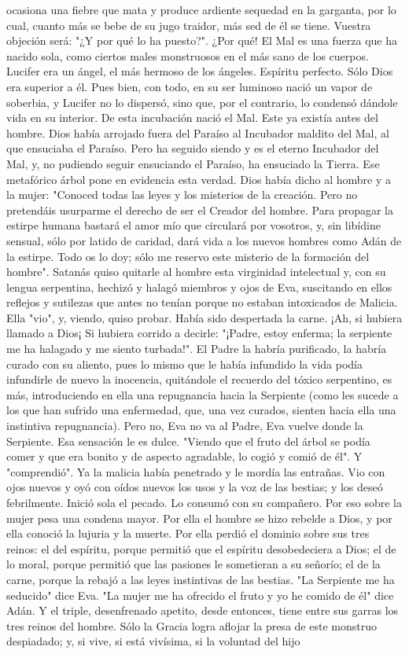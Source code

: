 \documentclass[12pt, twoside, openright]{book} %
\begin{document}
ocasiona una fiebre que mata y produce ardiente sequedad en la garganta, por lo cual, cuanto más se bebe de su jugo traidor, más sed de él se tiene. Vuestra objeción será: "¿Y por qué lo ha puesto?". ¿Por qué! El Mal es una fuerza que ha nacido sola, como ciertos males monstruosos en el más sano de los cuerpos. Lucifer era un ángel, el más hermoso de los ángeles. Espíritu perfecto. Sólo Dios era superior a él. Pues bien, con todo, en su ser luminoso nació un vapor de soberbia, y Lucifer no lo dispersó, sino que, por el contrario, lo condensó dándole vida en su interior. De esta incubación nació el Mal. Este ya existía antes del hombre. Dios había arrojado fuera del Paraíso al Incubador maldito del Mal, al que ensuciaba el Paraíso. Pero ha seguido siendo y es el eterno Incubador del Mal, y, no pudiendo seguir ensuciando el Paraíso, ha ensuciado la Tierra. Ese metafórico árbol pone en evidencia esta verdad. Dios había dicho al hombre y a la mujer: "Conoced todas las leyes y los misterios de la creación. Pero no pretendáis usurparme el derecho de ser el Creador del hombre. Para propagar la estirpe humana bastará el amor mío que circulará por vosotros, y, sin libídine sensual, sólo por latido de caridad, dará vida a los nuevos hombres como Adán de la estirpe. Todo os lo doy; sólo me reservo este misterio de la formación del hombre". Satanás quiso quitarle al hombre esta virginidad intelectual y, con su lengua serpentina, hechizó y halagó miembros y ojos de Eva, suscitando en ellos reflejos y sutilezas que antes no tenían porque no estaban intoxicados de Malicia. Ella "vio", y, viendo, quiso probar. Había sido despertada la carne. ¡Ah, si hubiera llamado a Dios¡ Si hubiera corrido a decirle: "¡Padre, estoy enferma; la serpiente me ha halagado y me siento turbada!". El Padre la habría purificado, la habría curado con su aliento, pues lo mismo que le había infundido la vida podía infundirle de nuevo la inocencia, quitándole el recuerdo del tóxico serpentino, es más, introduciendo en ella una repugnancia hacia la Serpiente (como les sucede a los que han sufrido una enfermedad, que, una vez curados, sienten hacia ella una instintiva repugnancia). Pero no, Eva no va al Padre, Eva vuelve donde la Serpiente. Esa sensación le es dulce. "Viendo que el fruto del árbol se podía comer y que era bonito y de aspecto agradable, lo cogió y comió de él". Y "comprendió". Ya la malicia había penetrado y le mordía las entrañas. Vio con ojos nuevos y oyó con oídos nuevos los usos y la voz de las bestias; y los deseó febrilmente. Inició sola el pecado. Lo consumó con su compañero. Por eso sobre la mujer pesa una condena mayor. Por ella el hombre se hizo rebelde a Dios, y por ella conoció la lujuria y la muerte. Por ella perdió el dominio sobre sus tres reinos: el del espíritu, porque permitió que el espíritu desobedeciera a Dios; el de lo moral, porque permitió que las pasiones le sometieran a su señorío; el de la carne, porque la rebajó a las leyes instintivas de las bestias. "La Serpiente me ha seducido" dice Eva. "La mujer me ha ofrecido el fruto y yo he comido de él" dice Adán. Y el triple, desenfrenado apetito, desde entonces, tiene entre sus garras los tres reinos del hombre. Sólo la Gracia logra aflojar la presa de este monstruo despiadado; y, si vive, si está vivísima, si la voluntad del hijo 
\end{document}
